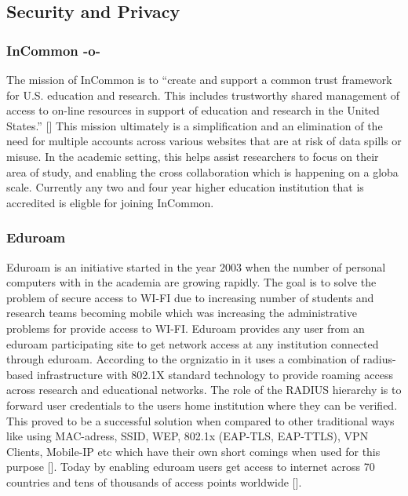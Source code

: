 \subsection{Security and Privacy}

\subsubsection{InCommon -o-}

The mission of InCommon is to ``create and support a common trust
framework for U.S. education and research.  This includes trustworthy
shared management of access to on-line resources in support of
education and research in the United States.'' [\cite{www-incommon}]
This mission ultimately is a simplification and an elimination of the
need for multiple accounts across various websites that are at risk of
data spills or misuse.  In the academic setting, this helps assist
researchers to focus on their area of study, and enabling the cross
collaboration which is happening on a globa scale.  Currently any two
and four year higher education institution that is accredited is
eligble for joining InCommon.

\subsubsection{Eduroam}

Eduroam is an initiative started in the year 2003 when the number of
personal computers with in the academia are growing rapidly. The goal
is to solve the problem of secure access to WI-FI due to increasing
number of students and research teams becoming mobile which was
increasing the administrative problems for provide access to
WI-FI. Eduroam provides any user from an eduroam participating site to
get network access at any institution connected through
eduroam. According to the orgnizatio in it uses a combination of
radius-based infrastructure with 802.1X standard technology to provide
roaming access across research and educational networks. The role of
the RADIUS hierarchy is to forward user credentials to the users home
institution where they can be verified. This proved to be a successful
solution when compared to other traditional ways like using
MAC-adress, SSID, WEP, 802.1x (EAP-TLS, EAP-TTLS), VPN Clients,
Mobile-IP etc which have their own short comings when used for this
purpose [\cite{eduroam-paper-2005}]. Today by enabling eduroam users get
access to internet across 70 countries and tens of thousands of access
points worldwide [\cite{www-eduroam}].


